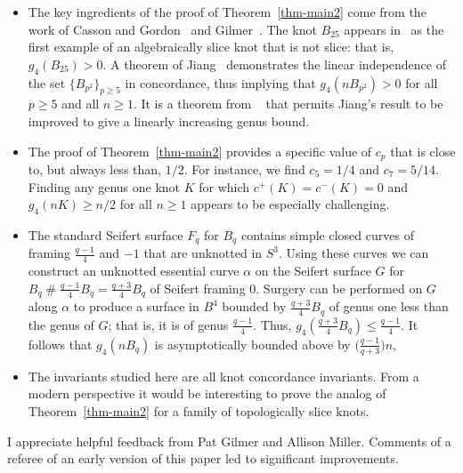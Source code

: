 \documentclass[10pt,oneside]{amsart}
\def\cs{\mathbin{\#}}
\theoremstyle{definition}
\begin{document}
\begin{itemize}
\item The key ingredients of the proof of Theorem~\ref{thm-main2} come from the work of Casson and Gordon~\cite{MR900252} and Gilmer~\cite{MR656619}.  The knot $B_{25}$ appears in~\cite{MR900252} as the   first example of an algebraically slice knot that is not slice: that is, $g_4(B_{25}) >0$.  A theorem of Jiang~\cite{MR620010}  demonstrates the  linear independence of the set   $\{B_{p^2}\}_{p \ge 5}$ in concordance, thus implying that $g_4(nB_{p^2}) >0$ for all $p \ge 5$ and all $n \ge 1$.  It is a theorem from ~\cite{MR656619} that permits Jiang's result to be improved to give a linearly increasing genus bound.

\item The proof of Theorem~\ref{thm-main2} provides a specific value of $c_p$ that is close to, but always less than, $1/2$. For instance, we find $c_5 = 1/4$ and $c_7 = 5/14$.  Finding any genus one knot $K$ for which $c^+(K) = c^-(K) = 0$ and $g_4(nK) \ge n/2$ for all $n \ge 1$ appears to be especially challenging.

\item The standard Seifert surface $F_q$ for $B_q$ contains  simple closed curves of framing  $\frac{q-1}{4}$ and $-1$ that are unknotted in $S^3$.  Using these curves we can construct an unknotted essential curve $\alpha$ on the Seifert surface $G$ for  $ B_q \cs \frac{ q-1}{4}B_q    = \frac{ q+3}{4}B_q$ of Seifert framing 0.  Surgery can be performed on  $G$ along $\alpha$ to produce a  surface in $B^4$ bounded by $\frac{ q+3}{4}B_q$   of genus one less than the genus of $G$; that is, it is  of genus $\frac{q-1}{4}$.  Thus, $g_4(\frac{ q+3}{4}B_q) \le \frac{q-1}{4}$.   It follows that $g_4(nB_q)$ is asymptotically bounded above by $\big(\frac{q-1}{q+3}\big)n$, 

\item  The invariants studied here are all knot concordance invariants.  From a modern perspective it would be interesting to prove the analog of Theorem~\ref{thm-main2} for a family of topologically slice knots.

\end{itemize}

\smallskip
{}  I appreciate helpful feedback from Pat Gilmer and Allison Miller.  Comments of a referee of an  early version of this paper led to significant improvements.

\end{document}
